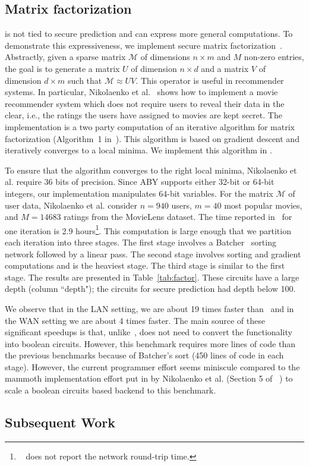 \subsection{Matrix factorization}
\tool is not tied to secure prediction and can express more general computations.
To demonstrate this expressiveness, we  implement secure matrix factorization~\cite{valeriaMatrix}. Abstractly, given a sparse matrix $\mathcal{M}$ of dimensions
$n\times m$ and $M$ non-zero entries, the goal is to generate a matrix $U$ of dimension $n\times d$ and a matrix
$V$ of dimension $d\times m$ such that $\mathcal{M}\approx UV$. This operator is useful in recommender systems.
In particular, Nikolaenko et al.~\cite{valeriaMatrix} shows how to implement a movie recommender system which does not require users to reveal their data in the clear, i.e., the ratings the users have assigned to movies are kept secret. The implementation is a two party computation of an iterative algorithm for matrix factorization (Algorithm~1 in~\cite{valeriaMatrix}).
This algorithm is based on gradient descent and iteratively converges to a local minima.
We implement this algorithm in \tool.
  
To ensure that the algorithm converges to the right local minima, Nikolaenko et al. require
36 bits of precision. Since ABY supports either 32-bit or 64-bit integers, our \tool implementation
manipulates 64-bit variables. For the matrix $\mathcal{M}$ of  user data, Nikolaenko et al. consider $n=940$ users, $m=40$ most popular movies, and $M=14683$ ratings from the MovieLens dataset. The time reported in~\cite{valeriaMatrix}
for one iteration is 2.9 hours\footnote{~\cite{valeriaMatrix} does not report the network round-trip time.}. This computation is large enough that we partition each iteration
into three stages. The first stage involves a Batcher~\cite{Batcher} sorting network followed by a linear pass.
The second stage involves sorting and gradient computations and is the heaviest stage.
The third  stage is similar to the first stage. The results are presented in Table~\ref{tab:factor}. These circuits have a large depth (column ``depth"); the circuits for secure prediction had depth below 100.


We observe that in the LAN setting, we are about 19 times faster than~\cite{valeriaMatrix} and in the WAN
setting we are about 4 times faster. The main source of these significant speedups is that, unlike~\cite{valeriaMatrix}, \tool does not need to convert the functionality into boolean circuits. 
However, this benchmark requires more lines of code than the previous benchmarks
because of  Batcher's sort (450 lines of \tool code in each stage).
However, the current programmer effort seems miniscule compared to the mammoth implementation effort
put in by Nikolaenko et al. (Section 5 of ~\cite{valeriaMatrix}) to scale a boolean circuits based
backend to this benchmark.

\subsection{Subsequent Work}


